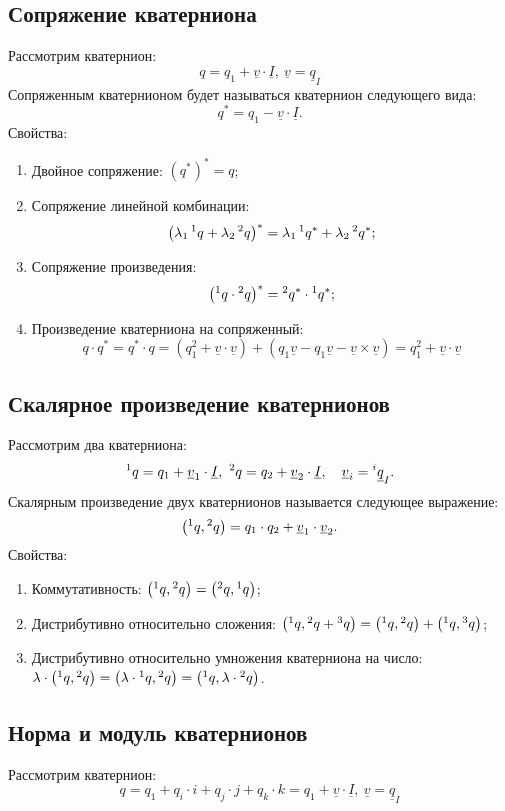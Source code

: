 \documentclass[fleqn]{extarticle}
\newcommand{\pares}[1]{ \left( #1 \right) }
\newcommand{\uv}{\underline{v}}
\newcommand{\uI}{\underline{I}}
\newcommand{\pq}[1]{\prescript{#1}{}{q}}
\begin{document}
		\subsection{Сопряжение кватерниона}
			Рассмотрим кватернион:
			\[ q = q_1 + \uv \cdot \uI, ~ \uv = \underline{q}_I \]
			Сопряженным кватернионом будет называться кватернион следующего вида:
			\[ q^{*} = q_1 - \uv \cdot \uI. \]
			Свойства:
			\begin{enumerate}
				\item Двойное сопряжение: $\pares{q^{*}}^{*} = q$;
				\item Сопряжение линейной комбинации: 
				\[ \pares{\lambda_1 \pq{1} + \lambda_2 \pq{2}}^{*} = \lambda_1 \pq{1}^{*} + \lambda_2 \pq{2}^{*}; \]
				\item Сопряжение произведения: 
				\[ \pares{\pq{1} \cdot \pq{2}}^{*} = \pq{2}^{*} \cdot \pq{1}^{*}; \]
				\item Произведение кватерниона на сопряженный: 
				\[ q \cdot q^{*} = q^{*} \cdot q = \pares{q_1^2 + \uv \cdot \uv} + \pares{q_1 \uv - q_1 \uv - \uv \times \uv} = q_1^2 + \uv \cdot \uv \]
			\end{enumerate}

		\subsection{Скалярное произведение кватернионов}

			Рассмотрим два кватерниона:
			\[ \pq{1} = q_1 + \uv_1 \cdot \uI, ~ \pq{2} = q_2 + \uv_2 \cdot \uI, \quad \uv_i = {\prescript{i}{}{\underline{q}}}_I. \]
			Скалярным произведение двух кватернионов называется следующее выражение:
			\[ \pares{\pq{1}, \pq{2}} = q_1 \cdot q_2 + \uv_1 \cdot \uv_2. \]
			Свойства:
			\begin{enumerate}
				\item Коммутативность: $\pares{\pq{1}, \pq{2}} = \pares{\pq{2}, \pq{1}}$;
				\item Дистрибутивно относительно сложения: $\pares{\pq{1}, \pq{2} + \pq{3}} = \pares{\pq{1}, \pq{2}} + \pares{\pq{1}, \pq{3}}$;
				\item Дистрибутивно относительно умножения кватерниона на число: $\lambda \cdot \pares{\pq{1}, \pq{2}} = \pares{\lambda \cdot \pq{1}, \pq{2}} = \pares{\pq{1}, \lambda \cdot \pq{2}}$.
			\end{enumerate}

		\subsection{Норма и модуль кватернионов}
			Рассмотрим кватернион:
			\[ q = q_1 + q_i \cdot i + q_j \cdot j + q_k \cdot k = q_1 + \uv \cdot \uI, ~ \uv = \underline{q}_I \]
\end{document}
